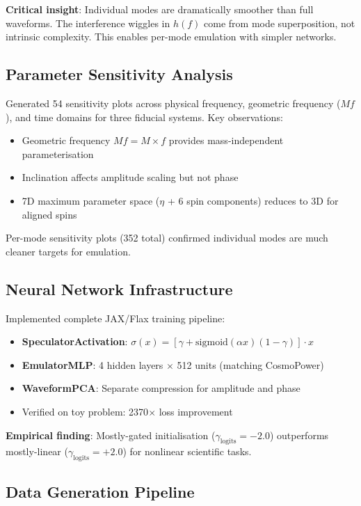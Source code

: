 \documentclass[11pt,a4paper]{article}
\begin{document}
\textbf{Critical insight}: Individual modes are dramatically smoother than full waveforms. The interference wiggles in $h(f)$ come from mode superposition, not intrinsic complexity. This enables per-mode emulation with simpler networks.

\subsection{Parameter Sensitivity Analysis}

Generated 54 sensitivity plots across physical frequency, geometric frequency ($Mf$), and time domains for three fiducial systems. Key observations:
\begin{itemize}
    \item Geometric frequency $Mf = M \times f$ provides mass-independent parameterisation
    \item Inclination affects amplitude scaling but not phase
    \item 7D maximum parameter space ($\eta$ + 6 spin components) reduces to 3D for aligned spins
\end{itemize}

Per-mode sensitivity plots (352 total) confirmed individual modes are much cleaner targets for emulation.

\subsection{Neural Network Infrastructure}

Implemented complete JAX/Flax training pipeline:
\begin{itemize}
    \item \textbf{SpeculatorActivation}: $\sigma(x) = [\gamma + \mathrm{sigmoid}(\alpha x)(1-\gamma)] \cdot x$
    \item \textbf{EmulatorMLP}: 4 hidden layers $\times$ 512 units (matching CosmoPower)
    \item \textbf{WaveformPCA}: Separate compression for amplitude and phase
    \item Verified on toy problem: 2370$\times$ loss improvement
\end{itemize}

\textbf{Empirical finding}: Mostly-gated initialisation ($\gamma_\text{logits} = -2.0$) outperforms mostly-linear ($\gamma_\text{logits} = +2.0$) for nonlinear scientific tasks.

\subsection{Data Generation Pipeline}
\end{document}
